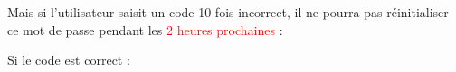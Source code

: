 \documentclass{article}
\begin{document}
\begin{enumerate}
               
\vspace{0.4cm}
\hspace*{-0.7in}
               \noindent{}
            
               
 \vspace{0.4cm}

Mais si l'utilisateur saisit un code 10 fois incorrect, il ne pourra pas réinitialiser ce mot de passe pendant les  \textcolor{red}{2 heures prochaines} :
 
\vspace{0.4cm}
\hspace*{-0.7in}
               \noindent{} 
 
 
 
 
               
Si le code est correct :



\end{enumerate}
\end{document}
